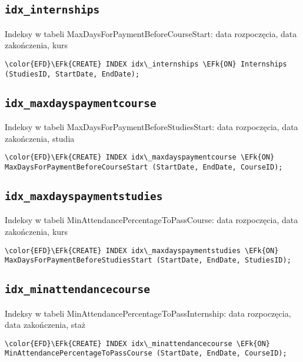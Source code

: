 \documentclass[11pt]{article}
\newcommand{\EFk}[1]{\textcolor{EFk}{\textbf{#1}}} %
\begin{document}
\subsection{\texttt{idx\_internships}}
\label{sec:org929ab57}
Indeksy w tabeli MaxDaysForPaymentBeforeCourseStart: data rozpoczęcia, data zakończenia, kurs
\begin{Code}
\begin{Verbatim}
\color{EFD}\EFk{CREATE} INDEX idx\_internships \EFk{ON} Internships (StudiesID, StartDate, EndDate);
\end{Verbatim}
\end{Code}
\subsection{\texttt{idx\_maxdayspaymentcourse}}
\label{sec:orge66084c}
Indeksy w tabeli MaxDaysForPaymentBeforeStudiesStart: data rozpoczęcia, data zakończenia, studia
\begin{Code}
\begin{Verbatim}
\color{EFD}\EFk{CREATE} INDEX idx\_maxdayspaymentcourse \EFk{ON} MaxDaysForPaymentBeforeCourseStart (StartDate, EndDate, CourseID);
\end{Verbatim}
\end{Code}
\subsection{\texttt{idx\_maxdayspaymentstudies}}
\label{sec:orgfadf66c}
Indeksy w tabeli MinAttendancePercentageToPassCourse: data rozpoczęcia, data zakończenia, kurs
\begin{Code}
\begin{Verbatim}
\color{EFD}\EFk{CREATE} INDEX idx\_maxdayspaymentstudies \EFk{ON} MaxDaysForPaymentBeforeStudiesStart (StartDate, EndDate, StudiesID);
\end{Verbatim}
\end{Code}
\subsection{\texttt{idx\_minattendancecourse}}
\label{sec:org7c23fe8}
Indeksy w tabeli MinAttendancePercentageToPassInternship: data rozpoczęcia, data zakończenia, staż
\begin{Code}
\begin{Verbatim}
\color{EFD}\EFk{CREATE} INDEX idx\_minattendancecourse \EFk{ON} MinAttendancePercentageToPassCourse (StartDate, EndDate, CourseID);
\end{Verbatim}
\end{Code}
\end{document}
